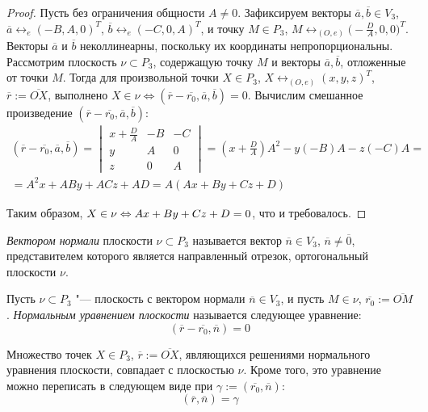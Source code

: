 \begin{proof}
	Пусть без ограничения общности $A \ne 0$. Зафиксируем векторы $\overline{a}, \overline{b} \in V_3$, $\overline a \leftrightarrow_{e} (-B, A, 0)^T$, $\overline b \leftrightarrow_{e} (-C, 0, A)^T$, и точку $M \in P_3$, $M \leftrightarrow_{(O, e)} \big(-\frac DA, 0, 0\big)^T$. Векторы $\overline{a}$ и $\overline{b}$ неколлинеарны, поскольку их координаты непропорциональны. Рассмотрим плоскость $\nu \subset P_3$, содержащую точку $M$ и векторы $\overline{a}, \overline{b}$, отложенные от точки $M$. Тогда для произвольной точки $X \in P_3$, $X \leftrightarrow_{(O, e)} (x, y, z)^T$, $\overline r := \overline{ OX }$, выполнено $X \in \nu \Leftrightarrow (\overline{r} - \overline{r_0}, \overline{a}, \overline{b}) = 0$. Вычислим смешанное произведение $(\overline{r} - \overline{r_0}, \overline{a}, \overline{b})$:
	\begin{multline*}
		(\overline{r} - \overline{r_0}, \overline{a}, \overline{b}) = \begin{vmatrix}
			x + \frac{D}{A} & -B & -C\\
			y & A & 0\\
			z & 0 & A
		\end{vmatrix} = \left(x + \frac{D}{A}\right)A^2 - y\left(-B\right)A - z(-C)A = 
		\\
		= A^2x + ABy + ACz + AD = A(Ax + By + Cz + D)
	\end{multline*}
	
	Таким образом, $X \in \nu \Leftrightarrow Ax + By + Cz + D = 0$, что и требовалось.
\end{proof}

\begin{definition}
	\textit{Вектором нормали} плоскости $\nu \subset P_3$ называется вектор $\overline{n} \in V_3$, $\overline{n} \ne \overline 0$, представителем которого является направленный отрезок, ортогональный плоскости $\nu$.
\end{definition}

\begin{definition}
	Пусть $\nu \subset P_3$ "--- плоскость с вектором нормали $\overline{n} \in V_3$, и пусть $M \in \nu$, $\overline{r_0} := \overline{OM}$. \textit{Нормальным уравнением плоскости} называется следующее уравнение:
	\[(\overline{r} - \overline{r_0}, \overline{n}) = 0\]
\end{definition}

\begin{note}
	Множество точек $X \in P_3$, $\overline{r} := \overline{OX}$, являющихся решениями нормального уравнения плоскости, совпадает с плоскостью $\nu$. Кроме того, это уравнение можно переписать в следующем виде при $\gamma := (\overline{r_0}, \overline{n})$:
	\[(\overline{r}, \overline{n}) = \gamma\]
\end{note}

